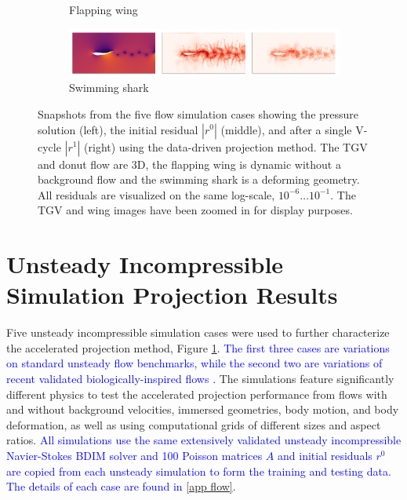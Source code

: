 \documentclass[]{elsarticle}
\begin{document}
\begin{figure}
\begin{subfigure}[c]{\textwidth}
        \caption{Flapping wing}
    \end{subfigure}
    \begin{subfigure}[b]{\textwidth}
        \centering
        \includegraphics[width=\textwidth]{figures/sharktriple.png}
        \caption{Swimming shark}
    \end{subfigure}
    \hfill
    \caption{Snapshots from the five flow simulation cases showing the pressure solution (left), the initial residual $|r^0|$ (middle), and after a single V-cycle $|r^1|$ (right) using the data-driven projection method. The TGV and donut flow are 3D, the flapping wing is dynamic without a background flow and the swimming shark is a deforming geometry. All residuals are visualized on the same log-scale, $10^{-6} \ldots 10^{-1}$. The TGV and wing images have been zoomed in for display purposes.}
    \label{fig:simulation cases}
\end{figure}

\section{Unsteady Incompressible Simulation Projection Results}

Five unsteady incompressible simulation cases were used to further characterize the accelerated projection method, Figure \ref{fig:simulation cases}. \textcolor{blue}{The first three cases are variations on standard unsteady flow benchmarks, while the second two are variations of recent validated biologically-inspired flows \cite{Lauber2022}.} The simulations feature significantly different physics to test the accelerated projection performance from flows with and without background velocities, immersed geometries, body motion, and body deformation, as well as using computational grids of different sizes and aspect ratios. \textcolor{blue}{All simulations use the same extensively validated unsteady incompressible Navier-Stokes BDIM solver \cite{maertens2015accurate,Lauber2022} and 100 Poisson matrices $A$ and initial residuals $r^0$ are copied from each unsteady simulation to form the training and testing data. The details of each case are found in \ref{app flow}.}
\end{document}
